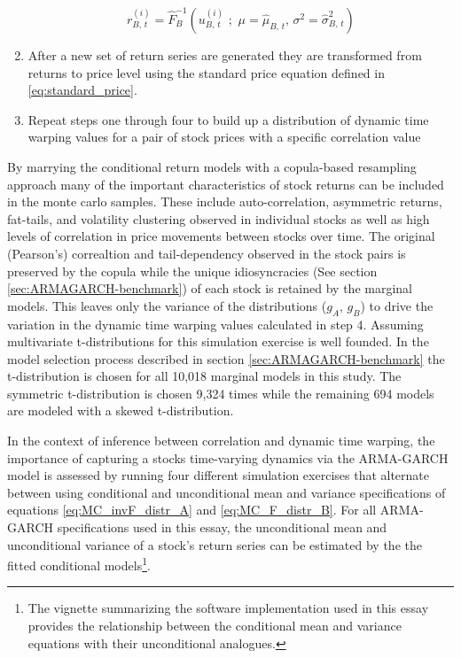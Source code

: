 \documentclass[12pt]{article}
\begin{document}
\begin{enumerate}
\begin{equation}
    \end{equation}
    \begin{equation} \label{eq:MC_invF_distr_B}
        r^{(i)}_{B,\,t} = \hat{F}^{-1}_{B} \left(u^{(i)}_{B,\,t}\,\,;\,\, \mu=\hat{\mu}_{B,\,t},\, \sigma^{2}=\hat{\sigma}^{2}_{B,\,t} \right)
    \end{equation} 
    \item After a new set of return series are generated they are transformed from returns to price level using the standard price equation defined in \ref{eq:standard_price}.
    \item Repeat steps one through four to build up a distribution of dynamic time warping values for a pair of stock prices with a specific correlation value
\end{enumerate}

By marrying the conditional return models with a copula-based resampling approach many of the important characteristics of stock returns can be included in the monte carlo samples. These include auto-correlation, asymmetric returns, fat-tails, and volatility clustering observed in individual stocks as well as high levels of correlation in price movements between stocks over time. The original (Pearson's) correaltion and tail-dependency observed in the stock pairs is preserved by the copula while the unique idiosyncracies (See section \ref{sec:ARMAGARCH-benchmark}) of each stock is retained by the marginal models. This leaves only the variance of the distributions ($g_{A},\,g_{B}$) to drive the variation in the dynamic time warping values calculated in step 4. Assuming multivariate t-distributions for this simulation exercise is well founded. In the model selection process described in section \ref{sec:ARMAGARCH-benchmark} the t-distribution is chosen for all 10,018 marginal models in this study. The symmetric t-distribution is chosen 9,324 times while the remaining 694 models are modeled with a skewed t-distribution.

In the context of inference between correlation and dynamic time warping, the importance of capturing a stocks time-varying dynamics via the ARMA-GARCH model is assessed by running four different simulation exercises that alternate between using conditional and unconditional mean and variance specifications of equations \ref{eq:MC_invF_distr_A} and \ref{eq:MC_F_distr_B}. For all ARMA-GARCH specifications used in this essay, the unconditional mean and unconditional variance of a stock's return series can be estimated by the the fitted conditional models\footnote{The vignette \cite{Rugarch} summarizing the software implementation used in this essay provides the relationship between the conditional mean and variance equations with their unconditional analogues.}.
\end{document}
